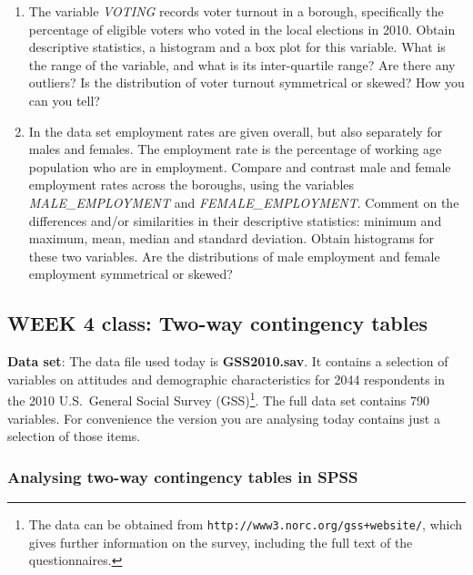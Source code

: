 \documentclass[11pt,a4paper,openany]{book}
\let\rmarkdownfootnote\footnote%
\def\footnote{\protect\rmarkdownfootnote}
\begin{document}
\begin{enumerate}
\def\labelenumi{\arabic{enumi}.}
\item
  The variable \emph{VOTING} records voter turnout in a borough,
  specifically the percentage of eligible voters who voted in the local
  elections in 2010. Obtain descriptive statistics, a histogram and a
  box plot for this variable. What is the range of the variable, and
  what is its inter-quartile range? Are there any outliers? Is the
  distribution of voter turnout symmetrical or skewed? How you can you
  tell?
\item
  In the data set employment rates are given overall, but also
  separately for males and females. The employment rate is the
  percentage of working age population who are in employment. Compare
  and contrast male and female employment rates across the boroughs,
  using the variables \emph{MALE\_EMPLOYMENT} and
  \emph{FEMALE\_EMPLOYMENT}. Comment on the differences and/or
  similarities in their descriptive statistics: minimum and maximum,
  mean, median and standard deviation. Obtain histograms for these two
  variables. Are the distributions of male employment and female
  employment symmetrical or skewed?
\end{enumerate}

\newpage

\subsection{WEEK 4 class: Two-way contingency
tables}\label{week-4-class-two-way-contingency-tables}

\textbf{Data set}: The data file used today is \textbf{GSS2010.sav}. It
contains a selection of variables on attitudes and demographic
characteristics for 2044 respondents in the 2010 U.S.~General Social
Survey (GSS)\footnote{The data can be obtained from
  \texttt{http://www3.norc.org/gss+website/}, which gives further
  information on the survey, including the full text of the
  questionnaires.}. The full data set contains 790 variables. For
convenience the version you are analysing today contains just a
selection of those items.

\subsubsection*{Analysing two-way contingency tables in
SPSS}\label{analysing-two-way-contingency-tables-in-spss}
\end{document}
